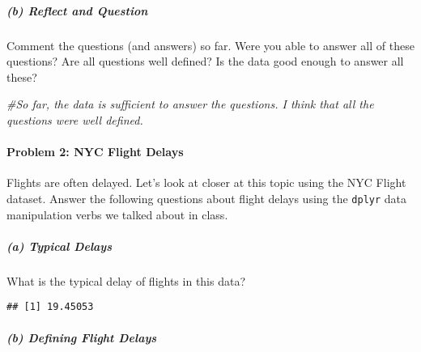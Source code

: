 \documentclass[
]{article}
\newenvironment{Shaded}{\begin{snugshade}}{\end{snugshade}}
\newcommand{\AttributeTok}[1]{\textcolor[rgb]{0.77,0.63,0.00}{#1}}
\newcommand{\CommentTok}[1]{\textcolor[rgb]{0.56,0.35,0.01}{\textit{#1}}}
\newcommand{\ConstantTok}[1]{\textcolor[rgb]{0.00,0.00,0.00}{#1}}
\newcommand{\FunctionTok}[1]{\textcolor[rgb]{0.00,0.00,0.00}{#1}}
\newcommand{\NormalTok}[1]{#1}
\newcommand{\SpecialCharTok}[1]{\textcolor[rgb]{0.00,0.00,0.00}{#1}}
\begin{document}
\hypertarget{b-reflect-and-question}{%
\subparagraph{(b) Reflect and Question}\label{b-reflect-and-question}}

Comment the questions (and answers) so far. Were you able to answer all
of these questions? Are all questions well defined? Is the data good
enough to answer all these?

\begin{Shaded}
\begin{Highlighting}[]
\CommentTok{\#So far, the data is sufficient to answer the questions. I think that all the questions were well defined. }
\end{Highlighting}
\end{Shaded}

\hypertarget{problem-2-nyc-flight-delays}{%
\paragraph{Problem 2: NYC Flight
Delays}\label{problem-2-nyc-flight-delays}}

Flights are often delayed. Let's look at closer at this topic using the
NYC Flight dataset. Answer the following questions about flight delays
using the \texttt{dplyr} data manipulation verbs we talked about in
class.

\hypertarget{a-typical-delays}{%
\subparagraph{(a) Typical Delays}\label{a-typical-delays}}

What is the typical delay of flights in this data?

\begin{Shaded}
\end{Shaded}

\begin{verbatim}
## [1] 19.45053
\end{verbatim}

\hypertarget{b-defining-flight-delays}{%
\subparagraph{(b) Defining Flight
Delays}\label{b-defining-flight-delays}}
\end{document}
